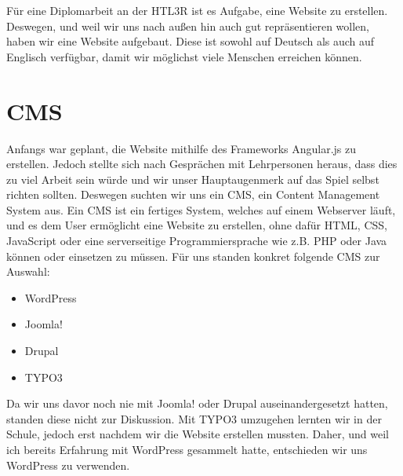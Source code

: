 \renewcommand{\kapitelautor}{Autor: Tobias Röhrer}

Für eine Diplomarbeit an der HTL3R ist es Aufgabe, eine Website zu erstellen.
Deswegen, und weil wir uns nach außen hin auch gut repräsentieren wollen, haben wir eine Website aufgebaut.
Diese ist sowohl auf Deutsch als auch auf Englisch verfügbar, damit wir möglichst viele Menschen erreichen können.

\section{CMS}
Anfangs war geplant, die Website mithilfe des Frameworks Angular.js zu erstellen.
Jedoch stellte sich nach Gesprächen mit Lehrpersonen heraus, dass dies zu viel Arbeit sein würde und wir unser Hauptaugenmerk auf das Spiel selbst richten sollten.
Deswegen suchten wir uns ein CMS, ein Content Management System aus.
Ein CMS ist ein fertiges System, welches auf einem Webserver läuft, und es dem User ermöglicht eine Website zu erstellen, ohne dafür HTML, CSS, JavaScript oder eine serverseitige Programmiersprache wie z.B. PHP oder Java können oder einsetzen zu müssen. \citep{website:CMSdefinition}
Für uns standen konkret folgende CMS zur Auswahl:
\begin{itemize}
    \item WordPress \citep{website:WordPress}
    \item Joomla! \citep{website:Joomla}
    \item Drupal \citep{website:Drupal}
    \item TYPO3 \citep{website:typo3}
\end{itemize}
Da wir uns davor noch nie mit Joomla! oder Drupal auseinandergesetzt hatten, standen diese nicht zur Diskussion.
Mit TYPO3 umzugehen lernten wir in der Schule, jedoch erst nachdem wir die Website erstellen mussten.
Daher, und weil ich bereits Erfahrung mit WordPress gesammelt hatte, entschieden wir uns WordPress zu verwenden.

